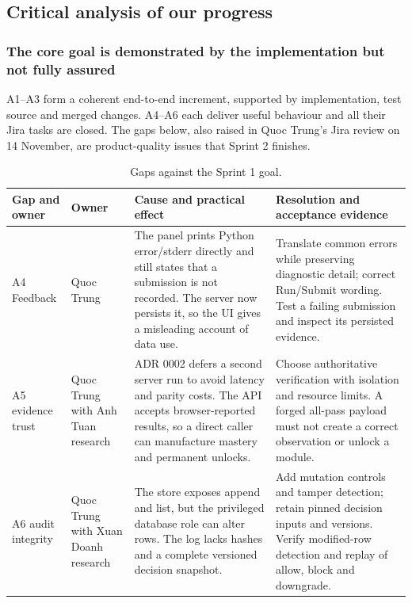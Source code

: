 \documentclass[11pt,a4paper]{article}
\begin{document}
\subsection{Critical analysis of our progress}
\subsubsection{The core goal is demonstrated by the implementation but not fully assured}
A1--A3 form a coherent end-to-end increment, supported by implementation, test source and merged changes. A4--A6 each deliver useful behaviour and all their Jira tasks are closed. The gaps below, also raised in Quoc Trung's Jira review on 14 November, are product-quality issues that Sprint 2 finishes.

{\small
\begin{longtable}{>{\raggedright\arraybackslash}p{}>{\raggedright\arraybackslash}p{}>{\raggedright\arraybackslash}p{}>{\raggedright\arraybackslash}p{}}
\caption{Gaps against the Sprint 1 goal.}\\
\toprule
\textbf{Gap and owner} & \textbf{Owner} & \textbf{Cause and practical effect} & \textbf{Resolution and acceptance evidence} \\
\midrule
\endhead
A4 Feedback & Quoc Trung & The panel prints Python error/stderr directly and still states that a submission is not recorded. The server now persists it, so the UI gives a misleading account of data use. & Translate common errors while preserving diagnostic detail; correct Run/Submit wording. Test a failing submission and inspect its persisted evidence. \\
A5 evidence trust & Quoc Trung with Anh Tuan research & ADR 0002 defers a second server run to avoid latency and parity costs. The API accepts browser-reported results, so a direct caller can manufacture mastery and permanent unlocks. & Choose authoritative verification with isolation and resource limits. A forged all-pass payload must not create a correct observation or unlock a module. \\
A6 audit integrity & Quoc Trung with Xuan Doanh research & The store exposes append and list, but the privileged database role can alter rows. The log lacks hashes and a complete versioned decision snapshot. & Add mutation controls and tamper detection; retain pinned decision inputs and versions. Verify modified-row detection and replay of allow, block and downgrade. \\
\bottomrule
\end{longtable}}
\end{document}
